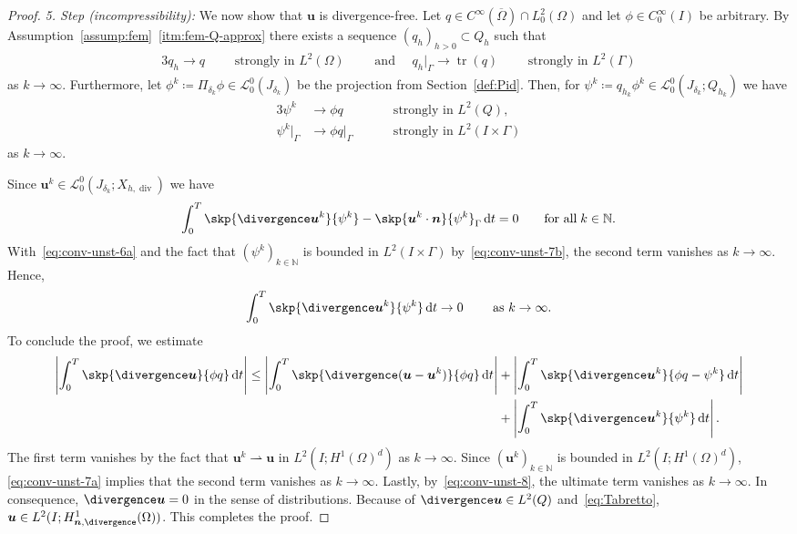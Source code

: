 \documentclass[reqno,a4paper]{amsart}
\def\abs#1{\left| #1 \right|}
\def\vec#1{\boldsymbol{#1}}
\def\tr{\mathop{\mathrm{tr}}\nolimits}
\def\diver{\mathop{\mathrm{div}}\nolimits} %
\def\d{{\rm d}}
\def\dt{\,\d t}
\def\bn{\vec{n}}
\def\bu{\vec{u}}
\begin{document}
\begin{proof}
		\textit{5. Step (incompressibility):}	
		We now show that $\bu$ is divergence-free. 	
		Let $q \in C^{\infty}(\overline \Omega)\cap L^2_0(\Omega)$ and let $\phi \in C^\infty_0(I)$ be arbitrary. By  Assumption~\ref{assump:fem}~\ref{itm:fem-Q-approx}  there exists  a sequence $(q_h)_{h>0} \subset Q_h$  such that 
		\begin{alignat}{3}\label{eq:conv-unst-7a-1}
			q_h \to q \qquad \text{ strongly in } L^2(\Omega) \qquad \text{ and }  \quad 
			q_h|_{\Gamma} \to \tr(q) \qquad \text{ strongly in } L^2(\Gamma)
		\end{alignat}
		as $k \to \infty$.					Furthermore, let $\phi^k \coloneqq \Pi_{\delta_k} \phi \in \mathcal{L}^0_0(J_{\delta_k})$ be the projection from Section~\eqref{def:Pid}. 
		Then, for $\psi^k \coloneqq q_{h_k} \phi^k \in \mathcal{L}^0_0(J_{\delta_k};Q_{h_k})$ we have 
		\begin{alignat}{3}\label{eq:conv-unst-7a}
			\psi^k &\to  \phi q \qquad &&\text{ strongly in } L^2(Q), \\
			\label{eq:conv-unst-7b}
			\psi^k|_{\Gamma} &\to \phi q|_{\Gamma} &&\text{ strongly in } L^2(I \times \Gamma)
		\end{alignat}
		as $k \to \infty$. 
		
		Since $\bu^k \in \mathcal{L}^0_0(J_{\delta_k};X_{h,\diver})$ we have 
		\begin{align*}
			\int_0^T \skp{\divergence \bu^k}{\psi^k} - \skp{\bu^k \cdot \bn}{ \psi^k}_{\Gamma} \dt = 0\qquad \text{for all}\;k\in\mathbb{N}. 
		\end{align*}
		With~\eqref{eq:conv-unst-6a} and the fact that $(\psi^k)_{k\in\mathbb{N}}$ is bounded in $L^2(I \times \Gamma)$ by~\eqref{eq:conv-unst-7b}, the second term vanishes as $k \to \infty$. Hence, 
		\begin{align}\label{eq:conv-unst-8}
			\int_0^T \skp{\divergence \bu^k}{\psi^k } \dt \to 0 \qquad \text{ as } k \to \infty.  
		\end{align}
		To conclude the proof, we estimate 
		\begin{equation}
			\begin{aligned}\label{eq:conv-unst-9}
				\abs{\int_0^T \skp{\divergence \bu}{\phi q} \dt}  
				\leq \abs{\int_0^T \skp{\divergence (\bu - \bu^k)}{\phi q} \dt} 
				&+ \abs{\int_0^T \skp{\divergence \bu^k}{\phi q - \psi^k} \dt}
				\\
				&+ \abs{\int_0^T \skp{\divergence \bu^k}{\psi^k} \dt}.
			\end{aligned}
		\end{equation}
		The first term vanishes by the fact that $\bu^k \rightharpoonup \bu$ in $L^2(I;H^1(\Omega)^d)$ as $k \to \infty$. 
		Since $(\bu^{k})_{k\in\mathbb{N}}$ is bounded in $L^{2}(I;H^{1}(\Omega)^{d})$, \eqref{eq:conv-unst-7a} implies that the second term vanishes as $k\to\infty$. 
		Lastly, by~\eqref{eq:conv-unst-8}, the ultimate term vanishes as $k \to \infty$. 
		In consequence, $\divergence \bu = 0$ in the sense of distributions. 
		Because of $\divergence \bu \in L^2(Q)$ and~\eqref{eq:Tabretto},  $\bu \in L^2(I;H^1_{\bn,\divergence}(\Omega))$. 
		This completes the proof. 
	\end{proof}
	
\end{document}

